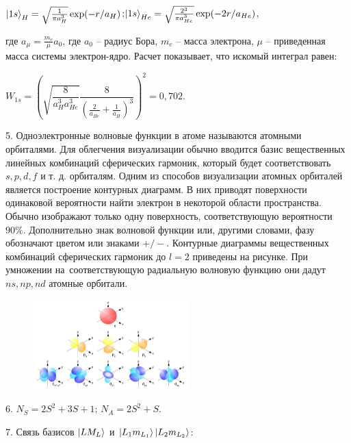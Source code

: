 \vspace{-\parskip+1mm}
$\ket{1s}_{H}=\sqrt{\frac{1}{\pi a^3_H}}\exp(-r/a_H)$;\quad $\ket{1s}_{He}=\sqrt{\frac{2^3}{\pi a^3_{He}}}\exp(-2r/a_{He})$,\par
\vspace{-\parskip+1mm}
где $a_{\mu}=\frac{m_e}{\mu}a_0$, где $a_0$ – радиус Бора, $m_e$ – масса электрона, $\mu$ – приведенная масса системы электрон-ядро. Расчет показывает, что искомый интеграл равен:\par
\vspace{-\parskip+2mm}
$W_{1s}=\left(\sqrt{\dfrac{8}{a_H^3 a_{He}^3}}\dfrac{8}{\left(\frac{2}{a_{He}}+\frac{1}{a_H}\right)^3}\right)^2 = 0,702$. \par
5. Одноэлектронные волновые функции в атоме называются атомными орбиталями. Для облегчения визуализации обычно вводится базис вещественных линейных комбинаций сферических гармоник, который будет соответствовать $s, p, d, f$ и т. д. орбиталям. Одним из способов визуализации атомных орбиталей является построение контурных диаграмм. В них приводят поверхности одинаковой вероятности найти электрон в некоторой области пространства. Обычно изображают только одну поверхность, соответствующую вероятности $90\%$. Дополнительно знак волновой функции или, другими словами, фазу обозначают цветом или знаками $+/-$. Контурные диаграммы вещественных комбинаций сферических гармоник до $l = 2$ приведены на рисунке. При умножении на~соответствующую радиальную волновую функцию они дадут $ns, np, nd$ атомные орбитали.\par
\vspace{-\parskip}
\vspace{0mm}
\begin{figure}[h]
\includegraphics[width=6.0cm]{images/Fig_1_1_4_dec.png}
\centering
\end{figure}
\vspace{-\parskip}
\vspace{2mm}
\par
6. $N_S = 2S^2+3S+1$; $N_A= 2S^2+S$.\par
7. Связь базисов $\ket{L M_L}$ и $\ket{L_1 m_{L_1}}\ket{L_2 m_{L_2}}$:\par
